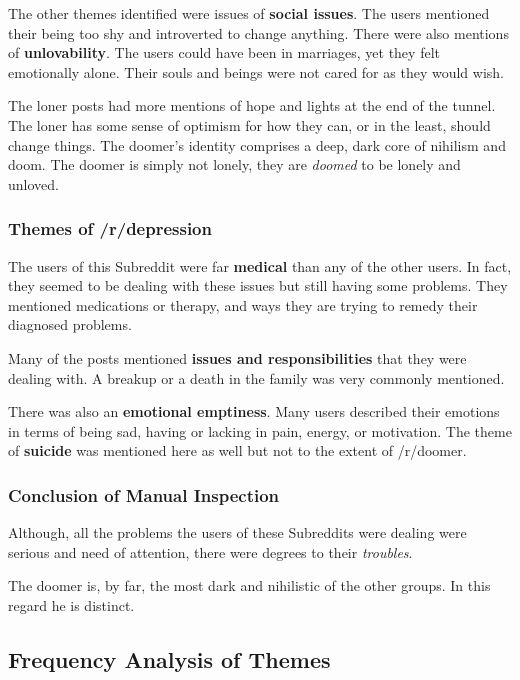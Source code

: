 \documentclass[../report.tex]{subfiles}
\begin{document}
The other themes identified were issues of \textbf{social issues}. The users mentioned their being too shy and introverted to change anything. 
There were also mentions of \textbf{unlovability}.
The users could have been in marriages, yet they felt emotionally alone.
Their souls and beings were not cared for as they would wish.

The loner posts had more mentions of hope and lights at the end of the tunnel. 
The loner has some sense of optimism for how they can, or in the least, should change things.
The doomer's identity comprises a deep, dark core of nihilism and doom.
The doomer is simply not lonely, they are \textit{doomed} to be lonely and unloved. 

\subsubsection{Themes of /r/depression}
The users of this Subreddit were far \textbf{medical} than any of the other users. 
In fact, they seemed to be dealing with these issues but still having some problems. 
They mentioned medications or therapy, and ways they are trying to remedy their diagnosed problems. 

Many of the posts mentioned \textbf{issues and responsibilities} that they were dealing with.
A breakup or a death in the family was very commonly mentioned. 

There was also an \textbf{emotional emptiness}. Many users described their emotions in terms of being sad, having or lacking in pain, energy, or motivation. 
The theme of \textbf{suicide} was mentioned here as well but not to the extent of /r/doomer.

\subsubsection{Conclusion of Manual Inspection}
Although, all the problems the users of these Subreddits were dealing were serious and need of attention, there were degrees to their \textit{troubles}.

The doomer is, by far, the most dark and nihilistic of the other groups. In this regard he is distinct. 

\subsection{Frequency Analysis of Themes}
\end{document}

